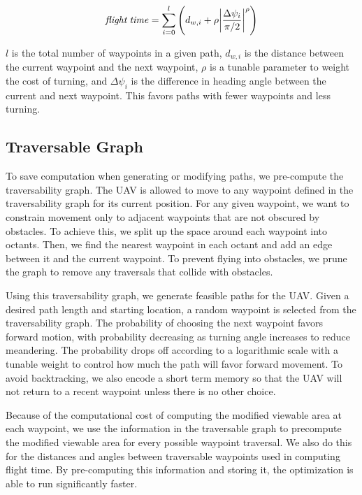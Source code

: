 \documentclass[letterpaper, 10 pt, conference]{ieeeconf}  %
\begin{document}
\begin{equation}%
    \mathit{flight\: time} = \sum_{i=0}^{l} \left(d_{w,i} + \rho\abs{\frac{\Delta \psi_i}{\pi/2}}^{\rho}\right)
\end{equation}

$l$ is the total number of waypoints in a given path, $d_{w,i}$ is the distance between the current waypoint and the next waypoint, $\rho$ is a tunable parameter to weight the cost of turning, and $\Delta \psi_i$ is the difference in heading angle between the current and next waypoint. This favors paths with fewer waypoints and less turning.

\subsection{Traversable Graph}

To save computation when generating or modifying paths, we pre-compute the traversability graph. The UAV is allowed to move to any waypoint defined in the traversability graph for its current position. For any given waypoint, we want to constrain movement only to adjacent waypoints that are not obscured by obstacles. To achieve this, we split up the space around each waypoint into octants. Then, we find the nearest waypoint in each octant and add an edge between it and the current waypoint. To prevent flying into obstacles, we prune the graph to remove any traversals that collide with obstacles.

Using this traversability graph, we generate feasible paths for the UAV. Given a desired path length and starting location, a random waypoint is selected from the traversability graph. The probability of choosing the next waypoint favors forward motion, with probability decreasing as turning angle increases to reduce meandering. The probability drops off according to a logarithmic scale with a tunable weight to control how much the path will favor forward movement. To avoid backtracking, we also encode a short term memory so that the UAV will not return to a recent waypoint unless there is no other choice.

Because of the computational cost of computing the modified viewable area at each waypoint, we use the information in the traversable graph to precompute the modified viewable area for every possible waypoint traversal. We also do this for the distances and angles between traversable waypoints used in computing flight time. By pre-computing this information and storing it, the optimization is able to run significantly faster.
\end{document}

